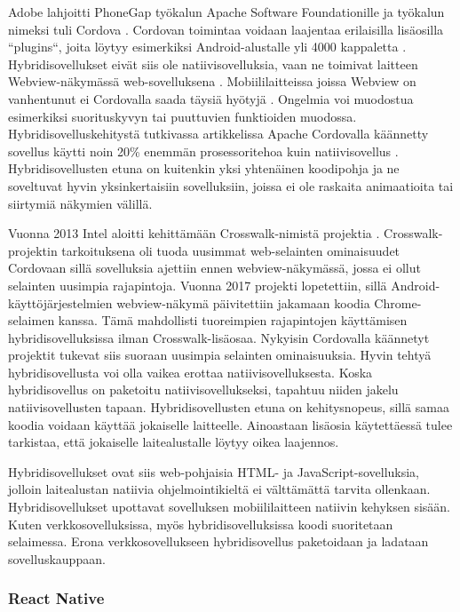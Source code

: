 \documentclass{tktltiki}
\begin{document}
Adobe lahjoitti PhoneGap työkalun Apache Software Foundationille ja työkalun nimeksi tuli Cordova \cite{Tung}. Cordovan toimintaa voidaan laajentaa erilaisilla lisäosilla “plugins“, joita löytyy esimerkiksi Android-alustalle yli 4000 kappaletta \cite{Cordova}. Hybridisovellukset eivät siis ole natiivisovelluksia, vaan ne toimivat laitteen Webview-näkymässä web-sovelluksena \cite{bosnic2016development}. Mobiililaitteissa joissa Webview on vanhentunut ei Cordovalla saada täysiä hyötyjä \cite{bosnic2016development}. Ongelmia voi muodostua esimerkiksi suorituskyvyn tai puuttuvien funktioiden muodossa. Hybridisovelluskehitystä tutkivassa artikkelissa Apache Cordovalla käännetty sovellus käytti noin 20\% enemmän prosessoritehoa kuin natiivisovellus \cite{bosnic2016development}. Hybridisovellusten etuna on kuitenkin yksi yhtenäinen koodipohja ja ne soveltuvat hyvin yksinkertaisiin sovelluksiin, joissa ei ole raskaita animaatioita tai siirtymiä näkymien välillä. 

Vuonna 2013 Intel aloitti kehittämään Crosswalk-nimistä projektia \cite{Crosswalk}. Crosswalk-projektin tarkoituksena oli tuoda uusimmat web-selainten ominaisuudet Cordovaan \cite{bosnic2016development} sillä sovelluksia ajettiin ennen webview-näkymässä, jossa ei ollut selainten uusimpia rajapintoja. Vuonna 2017 projekti lopetettiin, sillä Android-käyttöjärjestelmien webview-näkymä päivitettiin jakamaan koodia Chrome-selaimen kanssa. Tämä mahdollisti tuoreimpien rajapintojen käyttämisen hybridisovelluksissa ilman Crosswalk-lisäosaa. Nykyisin Cordovalla käännetyt projektit tukevat siis suoraan uusimpia selainten ominaisuuksia. Hyvin tehtyä hybridisovellusta voi olla vaikea erottaa natiivisovelluksesta. Koska hybridisovellus on paketoitu natiivisovellukseksi, tapahtuu niiden jakelu natiivisovellusten tapaan. Hybridisovellusten etuna on kehitysnopeus, sillä samaa koodia voidaan käyttää jokaiselle laitteelle. Ainoastaan lisäosia käytettäessä tulee tarkistaa, että jokaiselle laitealustalle löytyy oikea laajennos. 

Hybridisovellukset ovat siis web-pohjaisia HTML- ja JavaScript-sovelluksia, jolloin laitealustan natiivia ohjelmointikieltä ei välttämättä tarvita ollenkaan. Hybridisovellukset upottavat sovelluksen mobiililaitteen natiivin kehyksen sisään. Kuten verkkosovelluksissa, myös hybridisovelluksissa koodi suoritetaan selaimessa. Erona verkkosovellukseen hybridisovellus paketoidaan ja ladataan sovelluskauppaan. 

\subsubsection{React Native}
\end{document}
